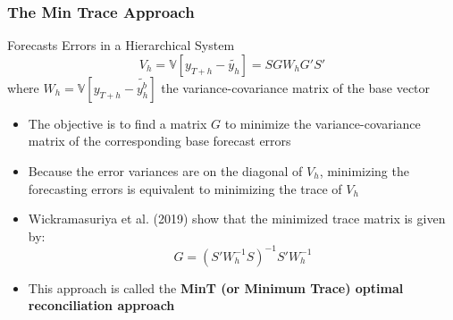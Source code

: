 \documentclass{beamer}
\begin{document}
 \begin{frame}
   \frametitle{The Min Trace Approach}
   \begin{block}{Forecasts Errors in a Hierarchical System}
     \begin{equation*}
       V_h = \mathbb{V}[y_{T+h} - \tilde{y_h}] = SGW_hG'S'
     \end{equation*}
   where $W_h = \mathbb{V}[y_{T+h} - \tilde{y^b_h}]$ the variance-covariance matrix of the base vector
 \end{block}
\bigskip

\begin{itemize}
  \item The objective is to find a matrix $G$ to minimize the variance-covariance matrix of the corresponding base forecast errors
  \item Because the error variances are on the diagonal of $V_h$, minimizing the forecasting errors is equivalent to minimizing the trace of $V_h$
  \item Wickramasuriya et al. (2019) show that the minimized trace matrix is given by:
    \begin{equation*}
      G = (S'W^{-1}_hS)^{-1}S'W_h^{-1}
    \end{equation*}
  \item This approach is called the \textbf{MinT (or Minimum Trace) optimal reconciliation approach}
    
\end{itemize} 
\end{frame}
\end{document}
